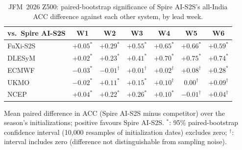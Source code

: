 \begin{table}[t]
  \centering
  \caption{JFM~2026 Z500: paired-bootstrap significance of Spire AI-S2S's all-India ACC difference against each other system, by lead week.}
  \label{tab:jfm_sig_z500}
  \small
  \begin{tabular}{lcccccc}
    \toprule
    vs.\ Spire AI-S2S & W1 & W2 & W3 & W4 & W5 & W6 \\
    \midrule
    FuXi-S2S       & $+0.05^{*}$ & $+0.29^{*}$ & $+0.55^{*}$ & $+0.65^{*}$ & $+0.66^{*}$ & $+0.59^{*}$ \\
DLESyM         & $+0.02^{*}$ & $+0.23^{*}$ & $+0.41^{*}$ & $+0.70^{*}$ & $+0.75^{*}$ & $+0.74^{*}$ \\
ECMWF          & $-0.03^{*}$ & $-0.01^{\dagger}$ & $+0.01^{\dagger}$ & $+0.02^{\dagger}$ & $+0.08^{\dagger}$ & $+0.28^{*}$ \\
UKMO           & $-0.02^{*}$ & $+0.11^{*}$ & $+0.15^{*}$ & $+0.10^{\dagger}$ & $0.00^{\dagger}$ & $+0.09^{\dagger}$ \\
NCEP           & $+0.04^{*}$ & $+0.22^{*}$ & $+0.26^{*}$ & $+0.10^{*}$ & $-0.01^{\dagger}$ & $+0.04^{\dagger}$ \\
    \bottomrule
  \end{tabular}

  \vspace{2pt}
  \footnotesize\raggedright
  Mean paired difference in ACC (Spire AI-S2S minus competitor)
  over the season's initializations; positive favours
  Spire AI-S2S. $^{*}$: 95\% paired-bootstrap confidence
  interval (10{,}000 resamples of initialization dates) excludes zero;
  $^{\dagger}$: interval includes zero (difference not distinguishable
  from sampling noise).
\end{table}
